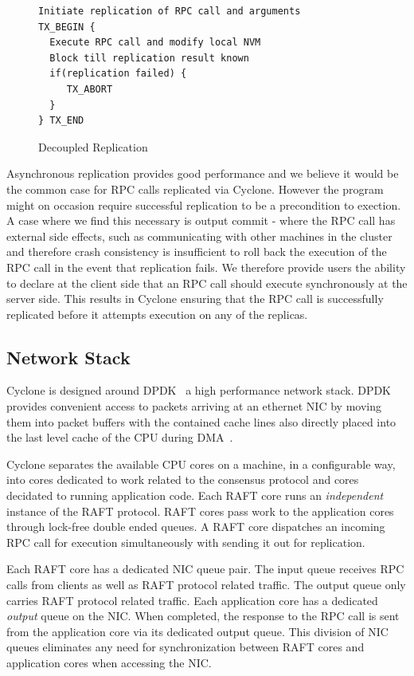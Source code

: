 \documentclass[letterpaper,twocolumn,10pt]{article}
\begin{document}
\begin{figure}
{ \scriptsize
\begin{verbatim}
Initiate replication of RPC call and arguments 
TX_BEGIN { 
  Execute RPC call and modify local NVM 
  Block till replication result known 
  if(replication failed) {
     TX_ABORT 
  } 
} TX_END
\end{verbatim}
}
\caption{Decoupled Replication}
\label{fig:async_rep}
\end{figure}

Asynchronous replication provides good performance and we believe it would be the
common case for RPC calls replicated via Cyclone. However the program might on
occasion require successful replication to be a precondition to exection. A case
where we find this necessary is output commit - where the RPC call has external
side effects, such as communicating with other machines in the cluster and
therefore crash consistency is insufficient to roll back the execution of the
RPC call in the event that replication fails. We therefore provide users the
ability to declare at the client side that an RPC call should execute
synchronously at the server side. This results in Cyclone ensuring that the RPC
call is successfully replicated before it attempts execution on any of the
replicas.

\subsection{Network Stack}
Cyclone is designed around DPDK~\cite{dpdk} a high performance network stack. DPDK
provides convenient access to packets arriving at an ethernet NIC by moving them
into packet buffers with the contained cache lines also directly placed into the
last level cache of the CPU during DMA~\cite{ddio}.

Cyclone separates the available CPU cores on a machine, in a configurable way,
into cores dedicated to work related to the consensus protocol and cores
decidated to running application code. Each RAFT core runs an \emph{independent}
instance of the RAFT protocol. RAFT cores pass work to the application cores
through lock-free double ended queues. A RAFT core dispatches an incoming RPC
call for execution simultaneously with sending it out for replication.

Each RAFT core has a dedicated NIC queue pair. The input queue receives RPC
calls from clients as well as RAFT protocol related traffic. The output queue
only carries RAFT protocol related traffic. Each application core has a
dedicated \emph{output} queue on the NIC. When completed, the response to the
RPC call is sent from the application core via its dedicated output queue. This
division of NIC queues eliminates any need for synchronization between RAFT
cores and application cores when accessing the NIC.
\end{document}
